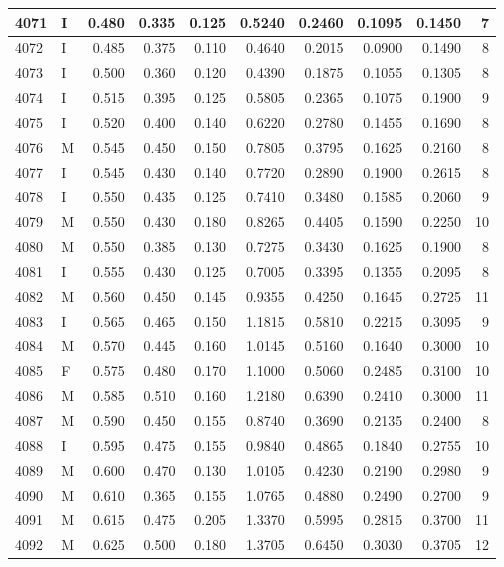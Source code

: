 \documentclass[9pt,twocolumn,twoside,]{pnas-new}
\begin{document}
\begin{tabular}{l|l|r|r|r|r|r|r|r|r}
\hline
4071 & I & 0.480 & 0.335 & 0.125 & 0.5240 & 0.2460 & 0.1095 & 0.1450 & 7\\
\hline
4072 & I & 0.485 & 0.375 & 0.110 & 0.4640 & 0.2015 & 0.0900 & 0.1490 & 8\\
\hline
4073 & I & 0.500 & 0.360 & 0.120 & 0.4390 & 0.1875 & 0.1055 & 0.1305 & 8\\
\hline
4074 & I & 0.515 & 0.395 & 0.125 & 0.5805 & 0.2365 & 0.1075 & 0.1900 & 9\\
\hline
4075 & I & 0.520 & 0.400 & 0.140 & 0.6220 & 0.2780 & 0.1455 & 0.1690 & 8\\
\hline
4076 & M & 0.545 & 0.450 & 0.150 & 0.7805 & 0.3795 & 0.1625 & 0.2160 & 8\\
\hline
4077 & I & 0.545 & 0.430 & 0.140 & 0.7720 & 0.2890 & 0.1900 & 0.2615 & 8\\
\hline
4078 & I & 0.550 & 0.435 & 0.125 & 0.7410 & 0.3480 & 0.1585 & 0.2060 & 9\\
\hline
4079 & M & 0.550 & 0.430 & 0.180 & 0.8265 & 0.4405 & 0.1590 & 0.2250 & 10\\
\hline
4080 & M & 0.550 & 0.385 & 0.130 & 0.7275 & 0.3430 & 0.1625 & 0.1900 & 8\\
\hline
4081 & I & 0.555 & 0.430 & 0.125 & 0.7005 & 0.3395 & 0.1355 & 0.2095 & 8\\
\hline
4082 & M & 0.560 & 0.450 & 0.145 & 0.9355 & 0.4250 & 0.1645 & 0.2725 & 11\\
\hline
4083 & I & 0.565 & 0.465 & 0.150 & 1.1815 & 0.5810 & 0.2215 & 0.3095 & 9\\
\hline
4084 & M & 0.570 & 0.445 & 0.160 & 1.0145 & 0.5160 & 0.1640 & 0.3000 & 10\\
\hline
4085 & F & 0.575 & 0.480 & 0.170 & 1.1000 & 0.5060 & 0.2485 & 0.3100 & 10\\
\hline
4086 & M & 0.585 & 0.510 & 0.160 & 1.2180 & 0.6390 & 0.2410 & 0.3000 & 11\\
\hline
4087 & M & 0.590 & 0.450 & 0.155 & 0.8740 & 0.3690 & 0.2135 & 0.2400 & 8\\
\hline
4088 & I & 0.595 & 0.475 & 0.155 & 0.9840 & 0.4865 & 0.1840 & 0.2755 & 10\\
\hline
4089 & M & 0.600 & 0.470 & 0.130 & 1.0105 & 0.4230 & 0.2190 & 0.2980 & 9\\
\hline
4090 & M & 0.610 & 0.365 & 0.155 & 1.0765 & 0.4880 & 0.2490 & 0.2700 & 9\\
\hline
4091 & M & 0.615 & 0.475 & 0.205 & 1.3370 & 0.5995 & 0.2815 & 0.3700 & 11\\
\hline
4092 & M & 0.625 & 0.500 & 0.180 & 1.3705 & 0.6450 & 0.3030 & 0.3705 & 12\\

\end{tabular}
\end{document}
